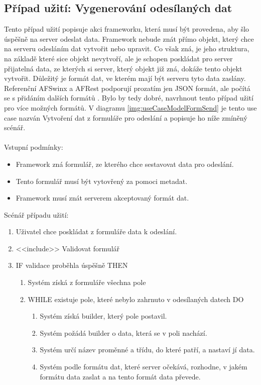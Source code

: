 \subsection{Případ užití: Vygenerování odesílaných dat}
Tento případ užití popisuje akci frameworku, která musí být provedena, aby šlo úspěšně na server odeslat data. Framework nebude znát přímo objekt, který chce na serveru odesláním dat vytvořit nebo upravit. Co však zná, je jeho struktura, na základě které sice objekt nevytvoří, ale je schopen poskládat pro server přijatelná data, ze kterých si server, který objekt již zná, dokáže tento objekt vytvořit. Důležitý je formát dat, ve kterém mají být serveru tyto data zaslány. Referenční AFSwinx a AFRest podporují prozatím jen JSON formát, ale počítá se s přidáním dalších formátů \cite{tomasek-thesis}. Bylo by tedy dobré, navrhnout tento případ užití pro více možných formátů. V diagramu \ref{img:useCaseModelFormSend} je tento use case nazván Vytvoření dat z formuláře pro odeslání a popisuje ho níže zmíněný scénář.\\\\
Vstupní podmínky:
\begin{itemize}
\item Framework zná formulář, ze kterého chce sestavovat data pro odeslání. 
\item Tento formulář musí být vytovřený za pomoci metadat. 
\item Framework musí znát serverem akceptovaný formát dat. 
\end{itemize}
Scénář případu užití:
\begin{enumerate}
\item Uživatel chce poskládat z formuláře data k odeslání.
\item <<include>> Validovat formulář
\item IF validace proběhla úspěšně THEN
\begin{enumerate}
\item Systém získá z formuláře všechna pole
\item WHILE existuje pole, které nebylo zahrnuto v odesílaných datech DO
\begin{enumerate}
\item Systém získá builder, který pole postavil.
\item Systém požádá builder o data, která se v poli nachází.
\item  Systém určí název proměnné a třídu, do které patří, a nastaví jí data.
\item  Systém podle formátu dat, které server očekává, rozhodne, v jakém formátu data zaslat a na tento formát data převede. 
\end{enumerate}
\end{enumerate}
\end{enumerate}


